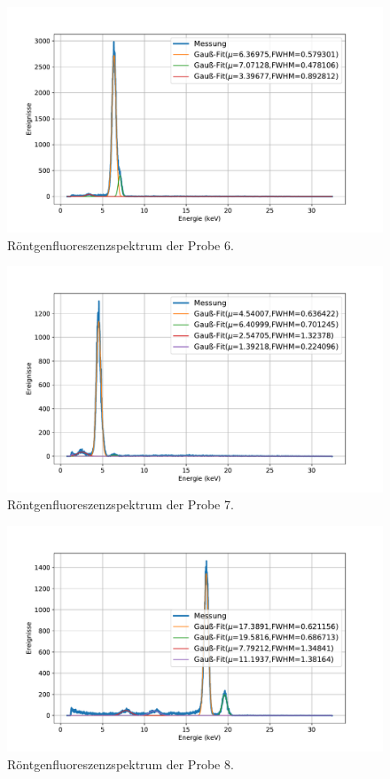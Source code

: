 \documentclass[
	a4paper,
	12pt,
	pagesize,
	ngerman
]{scrartcl}
\begin{document}
	\begin{figure}[H]
		\includegraphics[width=\textwidth]{images/6-EdelStahl.pdf}
		\centering
		\caption{Röntgenfluoreszenzspektrum der Probe 6.}
	\end{figure}

	\begin{figure}[H]
		\includegraphics[width=\textwidth]{images/7-Ti.pdf}
		\centering
		\caption{Röntgenfluoreszenzspektrum der Probe 7.}
	\end{figure}

	\begin{figure}[H]
		\includegraphics[width=\textwidth]{images/8-Mo.pdf}
		\centering
		\caption{Röntgenfluoreszenzspektrum der Probe 8.}
	\end{figure}
\end{document}
